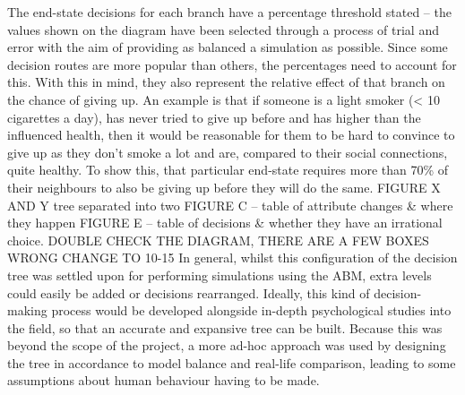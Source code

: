\documentclass[]{report}
\begin{document}
The end-state decisions for each branch have a percentage threshold stated – the values shown on the diagram have been selected through a process of trial and error with the aim of providing as balanced a simulation as possible. Since some decision routes are more popular than others, the percentages need to account for this. With this in mind, they also represent the relative effect of that branch on the chance of giving up. An example is that if someone is a light smoker (< 10 cigarettes a day), has never tried to give up before and has higher than the influenced health, then it would be reasonable for them to be hard to convince to give up as they don't smoke a lot and are, compared to their social connections, quite healthy. To show this, that particular end-state requires more than 70\% of their neighbours to also be giving up before they will do the same.
FIGURE X AND Y tree separated into two
FIGURE C – table of attribute changes \& where they happen
FIGURE E – table of decisions \& whether they have an irrational choice.
DOUBLE CHECK THE DIAGRAM, THERE ARE A FEW BOXES WRONG CHANGE TO 10-15
In general, whilst this configuration of the decision tree was settled upon for performing simulations using the ABM, extra levels could easily be added or decisions rearranged. Ideally, this kind of decision-making process would be developed alongside in-depth psychological studies into the field, so that an accurate and expansive tree can be built. Because this was beyond the scope of the project, a more ad-hoc approach was used by designing the tree in accordance to model balance and real-life comparison, leading to some assumptions about human behaviour having to be made.
\end{document}
